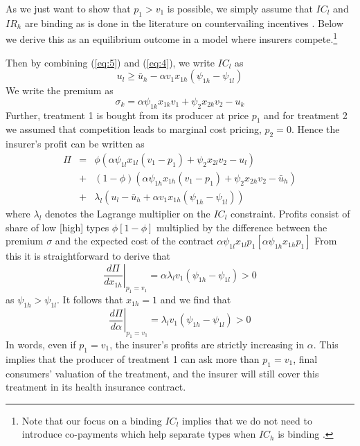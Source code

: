 \documentclass[12pt,english,a4paper]{article}
\begin{document}
As we just want to show that \(p_1 > v_1\) is possible, we simply assume that \(IC_l\) and \(IR_h\) are binding as is done in the literature on countervailing incentives \citep{LEWIS1989294}. Below we derive this as an equilibrium outcome in a model where insurers compete.\footnote{Note that our focus on a binding \(IC_l\) implies that we do not need to introduce co-payments which help separate types when \(IC_h\) is binding \citep{rot76}.}

Then by combining (\ref{eq:5}) and (\ref{eq:4}), we write \(IC_l\) as
\begin{equation}
\label{eq:6}
u_l \geq \bar u_h - \alpha v_1 x_{1h} (\psi_{1h}-\psi_{1l})
\end{equation}
We write the premium as
\begin{equation}
\label{eq:7}
\sigma_k = \alpha \psi_{1k} x_{1k} v_1 + \psi_2 x_{2k} v_2 - u_k
\end{equation}
Further, treatment 1 is bought from its producer at price \(p_1\) and for treatment 2 we assumed that competition leads to marginal cost pricing, \(p_2=0\). Hence the insurer's profit can be written as
\begin{eqnarray}
\label{eq:8}
\Pi &=& \phi (\alpha \psi_{1l}x_{1l}(v_1-p_1)+\psi_2 x_{2l}v_2 - u_l) \\
\nonumber
    &+& (1-\phi) (\alpha \psi_{1h} x_{1h}(v_1-p_1) + \psi_2 x_{2h} v_2 - \bar u_h) \\
\nonumber
 &+& \lambda_l(u_l - \bar u_h + \alpha v_1 x_{1h}(\psi_{1h}-\psi_{1l}))
\end{eqnarray}
where \(\lambda_l\) denotes the Lagrange multiplier on the \(IC_l\) constraint. Profits consist of share of low [high] types \(\phi [1-\phi]\) multiplied by the difference between the premium \(\sigma\) and the expected cost of the contract \(\alpha \psi_{1l} x_{1l} p_1 [\alpha \psi_{1h} x_{1h} p_1 ]\) From this it is straightforward to derive that
\begin{equation}
\label{eq:9}
\left. \frac{d\Pi}{dx_{1h}} \right|_{p_1=v_1} = \alpha \lambda_l v_1 (\psi_{1h}-\psi_{1l}) > 0
\end{equation}
as \(\psi_{1h}>\psi_{1l}\). It follows that \(x_{1h} =1\) and we find that
\begin{equation}
\label{eq:10}
\left. \frac{d\Pi}{d \alpha} \right|_{p_1=v_1} = \lambda_l v_1 (\psi_{1h}-\psi_{1l}) > 0
\end{equation}
In words, even if \(p_1=v_1\), the insurer's profits are strictly increasing in \(\alpha\). This implies that the producer of treatment 1 can ask more than \(p_1 = v_1\), final consumers' valuation of the treatment, and the insurer will still cover this treatment in its health insurance contract.
\end{document}
